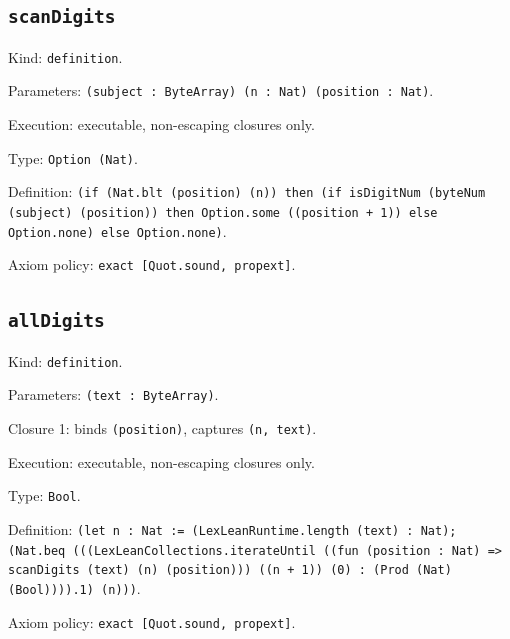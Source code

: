\documentclass[11pt]{article}
\begin{document}
\subsection*{\texttt{scanDigits}}
\noindent Kind: \texttt{definition}.\par
\noindent Parameters: \texttt{(subject : ByteArray) (n : Nat) (position : Nat)}.\par
\noindent Execution: executable, non-escaping closures only.\par
\noindent Type: \texttt{Option (Nat)}.\par
\noindent Definition: \texttt{(if (Nat.blt (position) (n)) then (if isDigitNum (byteNum (subject) (position)) then Option.some ((position + 1)) else Option.none) else Option.none)}.\par
\noindent Axiom policy: \texttt{exact [Quot.sound, propext]}.\par
\subsection*{\texttt{allDigits}}
\noindent Kind: \texttt{definition}.\par
\noindent Parameters: \texttt{(text : ByteArray)}.\par
\noindent Closure 1: binds \texttt{(position)}, captures \texttt{(n, text)}.\par
\noindent Execution: executable, non-escaping closures only.\par
\noindent Type: \texttt{Bool}.\par
\noindent Definition: \texttt{(let n : Nat := (LexLeanRuntime.length (text) : Nat); (Nat.beq (((LexLeanCollections.iterateUntil ((fun (position : Nat) => scanDigits (text) (n) (position))) ((n + 1)) (0) : (Prod (Nat) (Bool)))).1) (n)))}.\par
\noindent Axiom policy: \texttt{exact [Quot.sound, propext]}.\par
\end{document}
